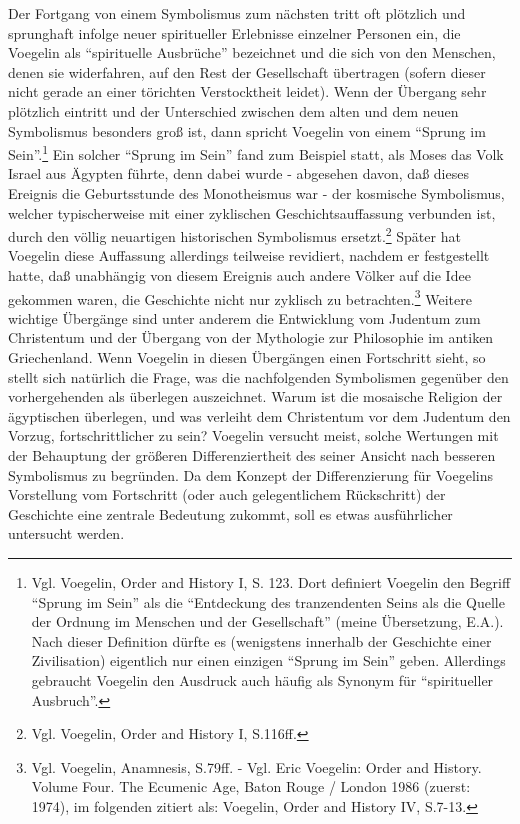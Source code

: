 Der Fortgang von einem Symbolismus zum nächsten tritt oft plötzlich und
sprunghaft infolge neuer spiritueller Erlebnisse einzelner Personen ein, die
Voegelin als "`spirituelle Ausbrüche"' bezeichnet und die sich von den
Menschen, denen sie widerfahren, auf den Rest der Gesellschaft übertragen
(sofern dieser nicht gerade an einer törichten Verstocktheit leidet). Wenn der
Übergang sehr plötzlich eintritt und der Unterschied zwischen dem alten und
dem neuen Symbolismus besonders groß ist, dann spricht Voegelin von einem
"`Sprung im Sein"'.\footnote{Vgl. Voegelin, Order and History I, S. 123. Dort
  definiert Voegelin den Begriff "`Sprung im Sein"' als die "`Entdeckung des
  tranzendenten Seins als die Quelle der Ordnung im Menschen und der
  Gesellschaft"' (meine Übersetzung, E.A.). Nach dieser Definition dürfte es
  (wenigstens innerhalb der Geschichte einer Zivilisation) eigentlich nur
  einen einzigen "`Sprung im Sein"' geben. Allerdings gebraucht Voegelin den
  Ausdruck auch häufig als Synonym für "`spiritueller Ausbruch"'.} Ein solcher
"`Sprung im Sein"' fand zum Beispiel statt, als Moses das Volk Israel aus
Ägypten führte, denn dabei wurde - abgesehen davon, daß dieses Ereignis die
Geburtsstunde des Monotheismus war - der kosmische Symbolismus, welcher
typischerweise mit einer zyklischen Geschichtsauf\/fassung verbunden ist, durch
den völlig neuartigen historischen Symbolismus ersetzt.\footnote{Vgl.
  Voegelin, Order and History I, S.116ff.}  Später hat Voegelin diese
Auf\/fassung allerdings teilweise revidiert, nachdem er festgestellt hatte, daß
unabhängig von diesem Ereignis auch andere Völker auf die Idee gekommen waren,
die Geschichte nicht nur zyklisch zu betrachten.\footnote{Vgl.  Voegelin,
  Anamnesis, S.79ff. - Vgl. Eric Voegelin: Order and History. Volume Four. The
  Ecumenic Age, Baton Rouge / London 1986 (zuerst: 1974), im folgenden zitiert
  als: Voegelin, Order and History IV, S.7-13.} Weitere wichtige Übergänge
sind unter anderem die Entwicklung vom Judentum zum Christentum und der
Übergang von der Mythologie zur Philosophie im antiken Griechenland. Wenn
Voegelin in diesen Übergängen einen Fortschritt sieht, so stellt sich
natürlich die Frage, was die nachfolgenden Symbolismen gegenüber den
vorhergehenden als überlegen auszeichnet.  Warum ist die mosaische
Religion der ägyptischen überlegen, und was verleiht dem Christentum vor dem
Judentum den Vorzug, fortschrittlicher zu sein?  Voegelin versucht meist,
solche Wertungen mit der Behauptung der größeren Differenziertheit des seiner
Ansicht nach besseren Symbolismus zu begründen.  Da dem Konzept der
Differenzierung für Voegelins Vorstellung vom Fortschritt (oder auch
gelegentlichem Rückschritt) der Geschichte eine zentrale Bedeutung zukommt,
soll es etwas ausführlicher untersucht werden.

